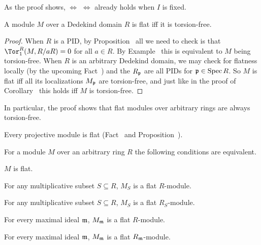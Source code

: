 \documentclass[a4paper,parskip=half,numbers=enddot, DIV=12]{scrreprt}
\begin{document}
\begin{rem*}
	As the proof shows,  $\Leftrightarrow$  $\Leftrightarrow$  already holds when $I$ is fixed.
\end{rem*}
\begin{cor}
	A module $M$ over a Dedekind domain $R$ is flat iff it is torsion-free.
\end{cor}
\begin{proof}
	When $R$ is a PID, by Proposition~ all we need to check is that $\Tor_1^R(M,R/aR)=0$ for all $a\in R$. By Example~ this is equivalent to $M$ being torsion-free. When $R$ is an arbitrary Dedekind domain, we may check for flatness locally (by the upcoming Fact~) and the $R_{\mathfrak{p}}$ are all PIDs for $\mathfrak{p}\in \operatorname{Spec} R$. So $M$ is flat iff all its localizations $M_{\mathfrak{p}}$ are torsion-free, and just like in the proof of Corollary~ this holds iff $M$ is torsion-free.
\end{proof}
\begin{rem*}
	In particular, the proof shows that flat modules over arbitrary rings are always torsion-free.
\end{rem*}
\begin{example}
	Every projective module is flat (Fact~ and Proposition~).
\end{example}
\begin{fact}
	For a module $M$ over an arbitrary ring $R$ the following conditions are equivalent.
	\begin{alphanumerate}
		\item $M$ is flat.
		\item For any multiplicative subset $S\subseteq R$, $M_S$ is a flat $R$-module.
		\item For any multiplicative subset $S\subseteq R$, $M_S$ is a flat $R_S$-module.
		\item For every maximal ideal $\mathfrak{m}$, $M_{\mathfrak{m}}$ is a flat $R$-module.
		\item For every maximal ideal $\mathfrak{m}$, $M_{\mathfrak{m}}$ is a flat $R_{\mathfrak{m}}$-module.
	\end{alphanumerate}
\end{fact}
\end{document}
